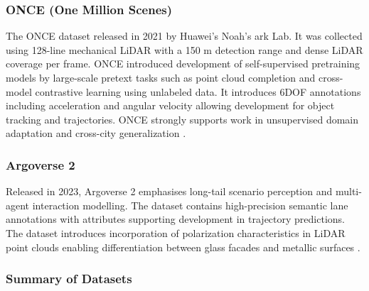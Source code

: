 \documentclass[12pt,a4paper]{article}
\begin{document}
\subsubsection{ONCE (One Million Scenes)}

The ONCE dataset released in 2021 by Huawei's Noah's ark Lab. It was collected using 128-line mechanical LiDAR with a 150 m detection range and dense LiDAR
coverage per frame. ONCE introduced development of self-supervised
pretraining models by large-scale pretext tasks such as point cloud
completion and cross-model contrastive learning using unlabeled data. It
introduces 6DOF annotations including acceleration and angular velocity
allowing development for object tracking and trajectories. ONCE strongly
supports work in unsupervised domain adaptation and cross-city
generalization \cite{bib_ref_19}.

\subsubsection{Argoverse 2}

Released in 2023, Argoverse 2 emphasises long-tail scenario perception and
multi-agent interaction modelling. The dataset contains high-precision
semantic lane annotations with attributes supporting development in
trajectory predictions. The dataset introduces incorporation of
polarization characteristics in LiDAR point clouds enabling
differentiation between glass facades and metallic surfaces
\cite{bib_ref_20}.

\subsubsection{Summary of Datasets}
\end{document}
